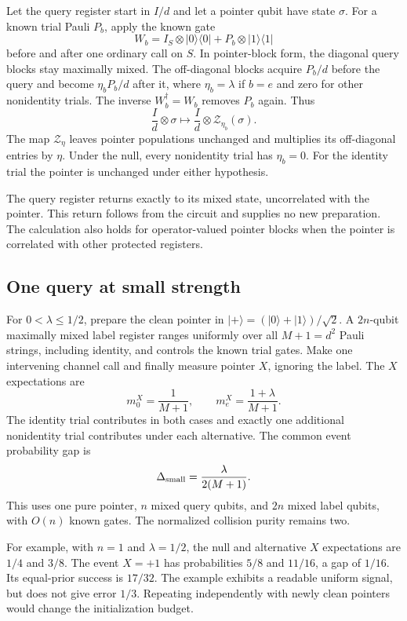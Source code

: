 \documentclass[11pt,a4paper]{article}
\numberwithin{equation}{section}
\theoremstyle{definition}
\theoremstyle{remark}
\begin{document}
Let the query register start in $I/d$ and let a pointer qubit have state
$\sigma$. For a known trial Pauli $P_b$, apply the known gate
\[
 W_b=I_S\otimes|0\rangle\langle0|
          +P_b\otimes|1\rangle\langle1|
\]
before and after one ordinary call on $S$. In pointer-block form, the diagonal
query blocks stay maximally mixed. The off-diagonal blocks acquire $P_b/d$
before the query and become $\eta_bP_b/d$ after it, where
$\eta_b=\lambda$ if $b=e$ and zero for other nonidentity trials.
The inverse $W_b^\dagger=W_b$ removes $P_b$ again. Thus
\begin{equation}
 \frac{I}{d}\otimes\sigma
 \longmapsto\frac{I}{d}\otimes\mathcal Z_{\eta_b}(\sigma).
 \label{q:gadget}
\end{equation}
The map $\mathcal Z_\eta$ leaves pointer populations unchanged and multiplies
its off-diagonal entries by $\eta$. Under the null, every nonidentity trial
has $\eta_b=0$. For the identity trial the pointer is unchanged under either
hypothesis.

The query register returns exactly to its mixed state, uncorrelated with the
pointer. This return follows from the circuit and supplies no new preparation.
The calculation also holds for operator-valued pointer blocks when the pointer
is correlated with other protected registers.

\subsection{One query at small strength}

For $0<\lambda\leq1/2$, prepare the clean pointer in
$|+\rangle=(|0\rangle+|1\rangle)/\sqrt2$. A $2n$-qubit maximally mixed
label register ranges uniformly over all $M+1=d^2$ Pauli strings, including
identity, and controls the known trial gates. Make one intervening channel
call and finally measure pointer $X$, ignoring the label.
The $X$ expectations are
\[
 m_0^X=\frac1{M+1},\qquad m_e^X=\frac{1+\lambda}{M+1}.
\]
The identity trial contributes in both cases and exactly one additional
nonidentity trial contributes under each alternative. The common event
probability gap is
\begin{equation}
 \Delta_{\rm small}=\frac{\lambda}{2(M+1)}.
 \label{q:small-gap}
\end{equation}
This uses one pure pointer, $n$ mixed query qubits, and $2n$ mixed label
qubits, with $O(n)$ known gates. The normalized collision purity remains two.

For example, with $n=1$ and $\lambda=1/2$, the null and alternative $X$
expectations are $1/4$ and $3/8$. The event $X=+1$ has probabilities $5/8$
and $11/16$, a gap of $1/16$. Its equal-prior success is $17/32$.
The example exhibits a readable uniform signal, but does not give error
$1/3$. Repeating independently with newly clean pointers would change the
initialization budget.
\end{document}
